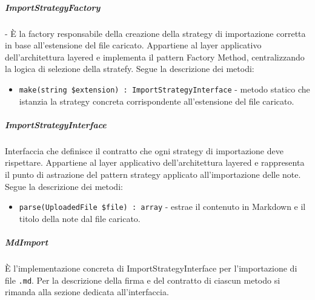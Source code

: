 \documentclass[a4paper,10pt]{article}
\begin{document}
\subparagraph{ImportStrategyFactory} - È la factory responsabile della creazione della strategy di importazione corretta in base all'estensione del file caricato. Appartiene al layer applicativo dell'architettura layered e implementa il pattern Factory Method, centralizzando la logica di selezione della stratefy. Segue la descrizione dei metodi:
\begin{itemize}
    \item \texttt{make(string \$extension) : ImportStrategyInterface} - metodo statico che istanzia la strategy concreta corrispondente all'estensione del file caricato.
\end{itemize} 
\subparagraph{ImportStrategyInterface} Interfaccia che definisce il contratto che ogni strategy di importazione deve rispettare. Appartiene al layer applicativo dell'architettura layered e rappresenta il punto di astrazione del pattern strategy applicato all'importazione delle note. Segue la descrizione dei metodi:
\begin{itemize}
    \item \texttt{parse(UploadedFile \$file) : array} - estrae il contenuto in Markdown e il titolo della note dal file caricato.
\end{itemize}
\subparagraph{MdImport} È l'implementazione concreta di ImportStrategyInterface per l'importazione di file \texttt{.md}. Per la descrizione della firma e del contratto di ciascun metodo si rimanda alla sezione dedicata all'interfaccia.
\end{document}
